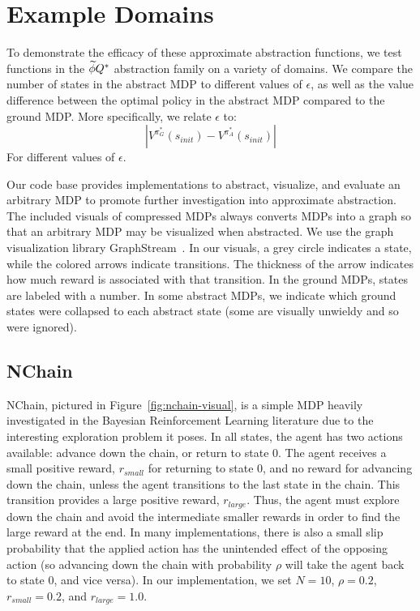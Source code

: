 \section{Example Domains}


To demonstrate the efficacy of these approximate abstraction functions, we test functions in the $\widetilde \phi{Q^*}$ abstraction family on a variety of domains. We compare the number of states in the abstract MDP to different values of $\epsilon$, as well as the value difference between the optimal policy in the abstract MDP compared to the ground MDP. More specifically, we relate $\epsilon$ to:
\begin{equation}
|V^{\pi_G^*}(s_{init}) - V^{\pi_A^*}(s_{init})|
\end{equation}
For different values of $\epsilon$.

Our code base provides implementations to abstract, visualize, and evaluate an arbitrary MDP to promote further investigation into approximate abstraction. The included visuals of compressed MDPs always converts MDPs into a graph so that an arbitrary MDP may be visualized when abstracted. We use the graph visualization library GraphStream~\cite{graphstream}. In our visuals, a grey circle indicates a state, while the colored arrows indicate transitions. The thickness of the arrow indicates how much reward is associated with that transition. In the ground MDPs, states are labeled with a number. In some abstract MDPs, we indicate which ground states were collapsed to each abstract state (some are visually unwieldy and so were ignored).


\subsection{NChain}

NChain, pictured in Figure~\ref{fig:nchain-visual}, is a simple MDP heavily investigated in the Bayesian Reinforcement Learning literature due to the interesting exploration problem it poses. In all states, the agent has two actions available: advance down the chain, or return to state 0. The agent receives a small positive reward, $r_{small}$ for returning to state 0, and no reward for advancing down the chain, unless the agent transitions to the last state in the chain. This transition provides a large positive reward, $r_{large}$. Thus, the agent must explore down the chain and avoid the intermediate smaller rewards in order to find the large reward at the end. In many implementations, there is also a small slip probability that the applied action has the unintended effect of the opposing action (so advancing down the chain with probability $\rho$ will take the agent back to state 0, and vice versa). In our implementation, we set $N=10$, $\rho=0.2$, $r_{small} = 0.2$, and $r_{large} = 1.0$.

